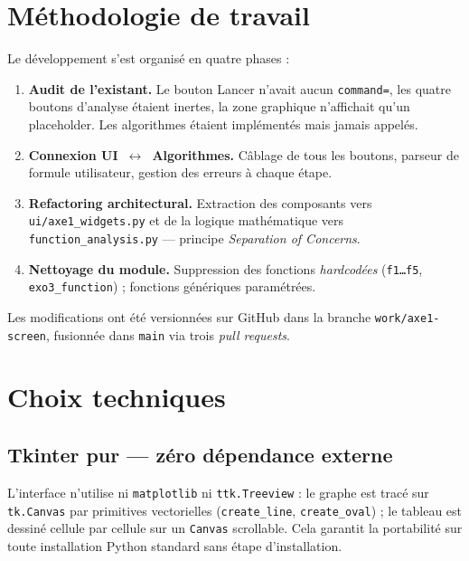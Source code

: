 \documentclass[11pt,a4paper]{article}
\begin{document}
\section{Méthodologie de travail}

Le développement s'est organisé en quatre phases :

\begin{enumerate}
  \item \textbf{Audit de l'existant.} Le bouton \og{}Lancer\fg{} n'avait aucun
        \texttt{command=}, les quatre boutons d'analyse étaient inertes, la zone graphique
        n'affichait qu'un placeholder. Les algorithmes étaient implémentés mais jamais appelés.
  \item \textbf{Connexion UI~$\leftrightarrow$~Algorithmes.} Câblage de tous les boutons,
        parseur de formule utilisateur, gestion des erreurs à chaque étape.
  \item \textbf{Refactoring architectural.} Extraction des composants vers
        \texttt{ui/axe1\_widgets.py} et de la logique mathématique vers
        \texttt{function\_analysis.py} — principe \textit{Separation of Concerns}.
  \item \textbf{Nettoyage du module.} Suppression des fonctions \textit{hardcodées}
        (\texttt{f1\ldots f5}, \texttt{exo3\_function}) ; fonctions génériques paramétrées.
\end{enumerate}

Les modifications ont été versionnées sur GitHub dans la branche \texttt{work/axe1-screen},
fusionnée dans \texttt{main} via trois \textit{pull requests}.

\section{Choix techniques}

\subsection{Tkinter pur — zéro dépendance externe}

L'interface n'utilise ni \texttt{matplotlib} ni \texttt{ttk.Treeview} : le graphe est
tracé sur \texttt{tk.Canvas} par primitives vectorielles (\texttt{create\_line},
\texttt{create\_oval}) ; le tableau est dessiné cellule par cellule sur un
\texttt{Canvas} scrollable. Cela garantit la portabilité sur toute installation Python
standard sans étape d'installation.
\end{document}
